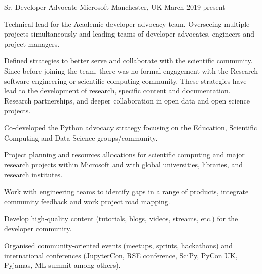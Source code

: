 


\begin{cventries}




\cventry
{Sr. Developer Advocate} %
{Microsoft} %
{Manchester, UK} %
{March 2019-present } %
{ %
\begin{cvitems}
\item {Technical lead for the Academic developer advocacy team. Overseeing multiple projects simultaneously and leading teams of developer advocates, engineers and project managers.}
\item { Defined strategies to better serve and collaborate with the scientific community. Since before joining the team, there was no formal engagement with the Research software engineering or scientific computing community. These strategies have lead to the development of research, specific content and documentation. Research partnerships, and deeper collaboration in open data and open science projects.}
\item {Co-developed the Python advocacy strategy focusing on the Education, Scientific Computing and Data Science groups/community.}
\item{Project planning and resources allocations for scientific computing and major research projects within Microsoft and with global universities, libraries, and research institutes. }
\item {Work with engineering teams to identify gaps in a range of products, integrate community feedback and work project road mapping.}
\item {Develop high-quality content (tutorials, blogs, videos, streams, etc.) for the developer community.}
\item {Organised community-oriented events (meetups, sprints, hackathons) and international conferences (JupyterCon, RSE conference, SciPy, PyCon UK, Pyjamas, ML summit among others).}
\end{cvitems}
}


\end{cventries}
